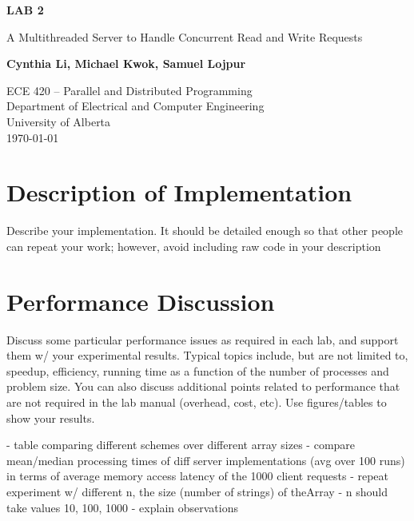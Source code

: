 \documentclass{article}
\begin{document}
\begin{titlepage}
    \begin{center}
        \vspace*{1cm}

        \textbf{\Large{LAB 2}}

        \vspace{0.5cm}

        \LARGE{A Multithreaded Server to Handle Concurrent Read and Write Requests}

        \vspace{1.5cm}

        \textbf{\Large{Cynthia Li, Michael Kwok, Samuel Lojpur}}

        \vfill

        ECE 420 -- Parallel and Distributed Programming\\
        Department of Electrical and Computer Engineering\\
        University of Alberta\\
        \today

    \end{center}
\end{titlepage}

\tableofcontents
\listoffigures
\listoftables

\pagebreak

\section{Description of Implementation}


Describe your implementation. It should be detailed enough so that other people can repeat your work; however, avoid including raw code in your description

\section{Performance Discussion}

Discuss some particular performance issues as required in each lab, and support them w/ your experimental results. Typical topics include, but are not limited to, speedup, efficiency, running time as a function of the number of processes and problem size. You can also discuss additional points related to performance that are not required in the lab manual (overhead, cost, etc). Use figures/tables to show your results.

- table comparing different schemes over different array sizes
- compare mean/median processing times of diff server implementations (avg over 100 runs) in terms of average memory access latency of the 1000 client requests
- repeat experiment w/ different n, the size (number of strings) of theArray
- n should take values 10, 100, 1000
- explain observations
\end{document}
